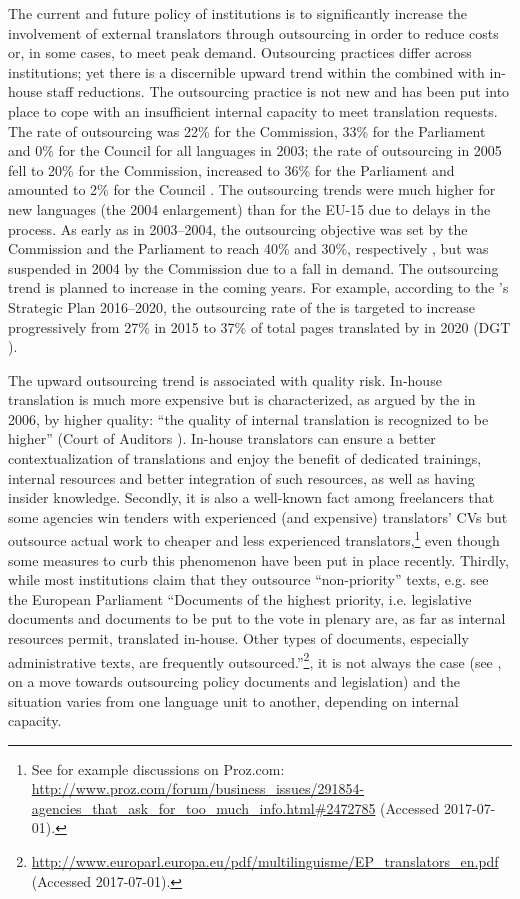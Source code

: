 \documentclass[output=paper]{langsci/langscibook}
\begin{document}
The current and future policy of  institutions is to significantly increase the involvement of external translators through outsourcing in order to reduce costs or, in some cases, to meet peak demand. Outsourcing practices differ across institutions; yet there is a discernible upward trend within the  combined with in-house staff reductions. The outsourcing practice is not new and has been put into place to cope with an insufficient internal capacity to meet translation requests. The rate of outsourcing was 22\% for the Commission, 33\% for the Parliament and 0\% for the Council for all languages in 2003; the rate of outsourcing in 2005 fell to 20\% for the Commission, increased to 36\% for the Parliament and amounted to 2\% for the Council \citep{EuropeanCourt2006}. The outsourcing trends were much higher for new languages (the 2004 enlargement) than for the EU-15 due to delays in the  process. As early as in 2003--2004, the outsourcing objective was set by the Commission and the Parliament to reach 40\% and 30\%, respectively \citep{EuropeanCourt2006}, but was suspended in 2004 by the Commission due to a fall in demand. The outsourcing trend is planned to increase in the coming years. For example, according to the  ’s Strategic Plan 2016--2020, the outsourcing rate of the  is targeted to increase progressively from 27\% in 2015 to 37\% of total pages translated by  in 2020 (DGT \citeyear[11]{DGT2016b}). 

The upward outsourcing trend is associated with quality risk. In-house translation is much more expensive but is characterized, as argued by the \citeauthor{EuropeanCourt2006} in 2006, by higher quality: “the quality of internal translation is recognized to be higher” (Court of Auditors \citeyear{EuropeanCourt2006}). In-house translators can ensure a better contextualization of translations and enjoy the benefit of dedicated trainings, internal resources and better integration of such resources, as well as having insider knowledge. Secondly, it is also a well-known fact among freelancers that some agencies win tenders with experienced (and expensive) translators’ CVs but outsource actual work to cheaper and less experienced translators,\footnote{See for example discussions on Proz.com: \url{http://www.proz.com/forum/business_issues/291854-agencies_that_ask_for_too_much_info.html\#2472785} (Accessed 2017-07-01).} even though some measures to curb this phenomenon have been put in place recently. Thirdly, while most institutions claim that they outsource “non-priority” texts, e.g. see the European Parliament “Documents of the highest priority, i.e. legislative documents and documents to be put to the vote in plenary are, as far as internal resources permit, translated in-house. Other types of documents, especially administrative texts, are frequently outsourced.”\footnote{\url{http://www.europarl.europa.eu/pdf/multilinguisme/EP_translators_en.pdf} (Accessed 2017-07-01).}, it is not always the case (see \citealt{Strandvik2017}, on a move towards outsourcing policy documents and legislation) and the situation varies from one language unit to another, depending on internal capacity.
\end{document}
